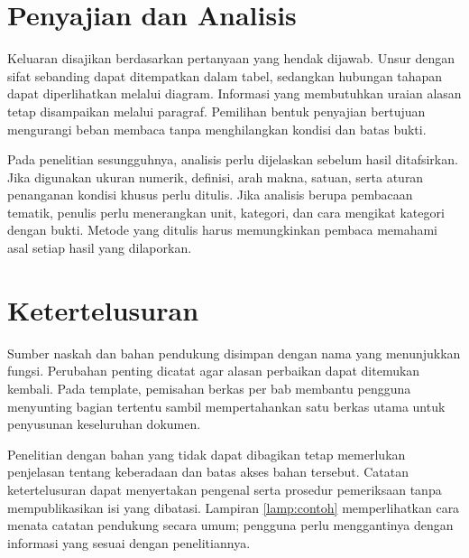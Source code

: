 \section{Penyajian dan Analisis}

Keluaran disajikan berdasarkan pertanyaan yang hendak dijawab. Unsur dengan sifat sebanding dapat ditempatkan dalam tabel, sedangkan hubungan tahapan dapat diperlihatkan melalui diagram. Informasi yang membutuhkan uraian alasan tetap disampaikan melalui paragraf. Pemilihan bentuk penyajian bertujuan mengurangi beban membaca tanpa menghilangkan kondisi dan batas bukti.

Pada penelitian sesungguhnya, analisis perlu dijelaskan sebelum hasil ditafsirkan. Jika digunakan ukuran numerik, definisi, arah makna, satuan, serta aturan penanganan kondisi khusus perlu ditulis. Jika analisis berupa pembacaan tematik, penulis perlu menerangkan unit, kategori, dan cara mengikat kategori dengan bukti. Metode yang ditulis harus memungkinkan pembaca memahami asal setiap hasil yang dilaporkan.

\section{Ketertelusuran}

Sumber naskah dan bahan pendukung disimpan dengan nama yang menunjukkan fungsi. Perubahan penting dicatat agar alasan perbaikan dapat ditemukan kembali. Pada template, pemisahan berkas per bab membantu pengguna menyunting bagian tertentu sambil mempertahankan satu berkas utama untuk penyusunan keseluruhan dokumen.

Penelitian dengan bahan yang tidak dapat dibagikan tetap memerlukan penjelasan tentang keberadaan dan batas akses bahan tersebut. Catatan ketertelusuran dapat menyertakan pengenal serta prosedur pemeriksaan tanpa mempublikasikan isi yang dibatasi. Lampiran \ref{lamp:contoh} memperlihatkan cara menata catatan pendukung secara umum; pengguna perlu menggantinya dengan informasi yang sesuai dengan penelitiannya.
